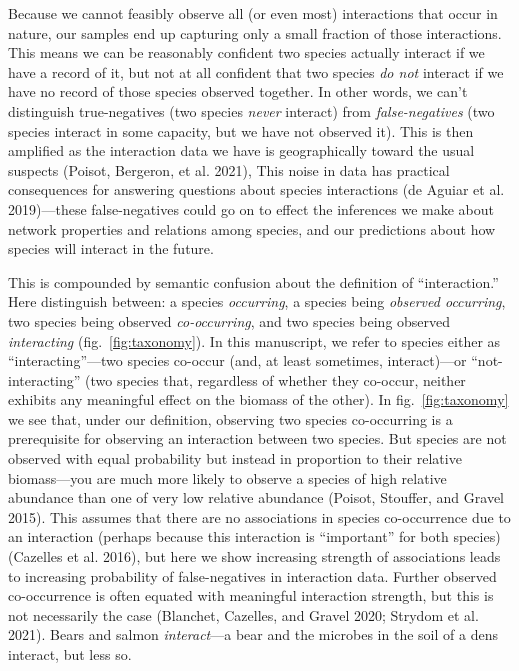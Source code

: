 \documentclass[10pt,oneside]{article}
\begin{document}
Because we cannot feasibly observe all (or even most) interactions that
occur in nature, our samples end up capturing only a small fraction of
those interactions. This means we can be reasonably confident two
species actually interact if we have a record of it, but not at all
confident that two species \emph{do not} interact if we have no record
of those species observed together. In other words, we can't distinguish
true-negatives (two species \emph{never} interact) from
\emph{false-negatives} (two species interact in some capacity, but we
have not observed it). This is then amplified as the interaction data we
have is geographically toward the usual suspects (Poisot, Bergeron, et
al. 2021), This noise in data has practical consequences for answering
questions about species interactions (de Aguiar et al. 2019)---these
false-negatives could go on to effect the inferences we make about
network properties and relations among species, and our predictions
about how species will interact in the future.

This is compounded by semantic confusion about the definition of
``interaction.'' Here distinguish between: a species \emph{occurring}, a
species being \emph{observed occurring}, two species being observed
\emph{co-occurring}, and two species being observed \emph{interacting}
(fig.~\ref{fig:taxonomy}). In this manuscript, we refer to species
either as ``interacting''---two species co-occur (and, at least
sometimes, interact)---or ``not-interacting'' (two species that,
regardless of whether they co-occur, neither exhibits any meaningful
effect on the biomass of the other). In fig.~\ref{fig:taxonomy} we see
that, under our definition, observing two species co-occurring is a
prerequisite for observing an interaction between two species. But
species are not observed with equal probability but instead in
proportion to their relative biomass---you are much more likely to
observe a species of high relative abundance than one of very low
relative abundance (Poisot, Stouffer, and Gravel 2015). This assumes
that there are no associations in species co-occurrence due to an
interaction (perhaps because this interaction is ``important'' for both
species) (Cazelles et al. 2016), but here we show increasing strength of
associations leads to increasing probability of false-negatives in
interaction data. Further observed co-occurrence is often equated with
meaningful interaction strength, but this is not necessarily the case
(Blanchet, Cazelles, and Gravel 2020; Strydom et al. 2021). Bears and
salmon \emph{interact}---a bear and the microbes in the soil of a dens
interact, but less so.
\end{document}
